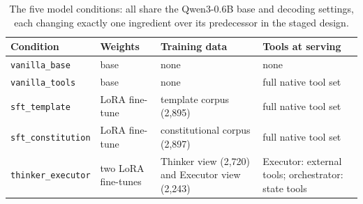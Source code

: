 \begin{table}[H]
  \centering
  \caption{The five model conditions: all share the Qwen3-0.6B base and decoding settings, each changing exactly one ingredient over its predecessor in the staged design.}
  \label{tab:conditions}
  \begin{tabular}{llp{4.2cm}l}
    \hline
    Condition & Weights & Training data & Tools at serving \\
    \hline
    \texttt{vanilla\_base} & base & none & none \\
    \texttt{vanilla\_tools} & base & none & full native tool set \\
    \texttt{sft\_template} & LoRA fine-tune & template corpus (2,895) & full native tool set \\
    \texttt{sft\_constitution} & LoRA fine-tune & constitutional corpus (2,897) & full native tool set \\
    \texttt{thinker\_executor} & two LoRA fine-tunes & Thinker view (2,720) and Executor view (2,243) & Executor: external tools; orchestrator: state tools \\
    \hline
  \end{tabular}
\end{table}

